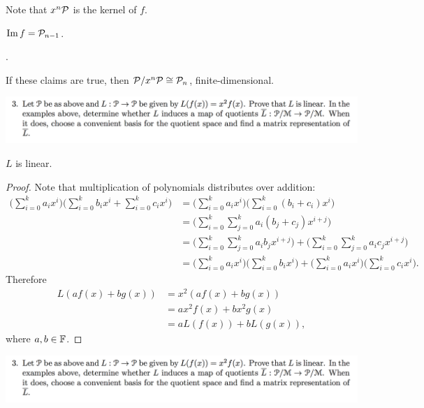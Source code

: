 \documentclass[12pt]{article}
\begin{document}
Note that $x^n\mathcal P$ is the kernel of $f$.

\begin{claim*}
  $\operatorname{\mathrm{Im}} f = \mathcal P_{n-1}$.
\end{claim*}

.

If these claims are true, then $\mathcal P/x^n\mathcal P \cong \mathcal P_n$, finite-dimensional.

\begin{mdframed}
\includegraphics[width=400pt]{img/linear-algebra-a0-2-3.png}
\end{mdframed}

\begin{claim*}
  $L$ is linear.
\end{claim*}

\begin{proof} Note that multiplication of polynomials distributes over addition:
  \begin{align*}
    \Big(\sum_{i=0}^k a_ix^i\Big)\Big(\sum_{i=0}^k b_ix^i + \sum_{i=0}^k c_ix^i\Big)
    &= \Big(\sum_{i=0}^k a_ix^i\Big)\Big(\sum_{i=0}^k (b_i + c_i)x^i\Big)\\
    &= \Big(\sum_{i=0}^{k}\sum_{j=0}^k a_i(b_j + c_j)x^{i+j}\Big)\\
    &= \Big(\sum_{i=0}^{k}\sum_{j=0}^k a_ib_jx^{i+j}\Big) +
       \Big(\sum_{i=0}^{k}\sum_{j=0}^k a_ic_jx^{i+j}\Big)\\
    &= \Big(\sum_{i=0}^k a_ix^i\Big)\Big(\sum_{i=0}^k b_ix^i\Big) +
       \Big(\sum_{i=0}^k a_ix^i\Big)\Big(\sum_{i=0}^k c_ix^i\Big).
  \end{align*}
  Therefore
  \begin{align*}
    L(af(x) + bg(x)) &= x^2(af(x) + bg(x))\\
                     &= ax^2f(x) + bx^2g(x)\\
                     &= aL(f(x)) + bL(g(x)),
  \end{align*}
  where $a, b \in \mathbb{F}$.
\end{proof}

\newpage
\begin{mdframed}
\includegraphics[width=400pt]{img/linear-algebra-a0-2-3.png}
\end{mdframed}
\end{document}
